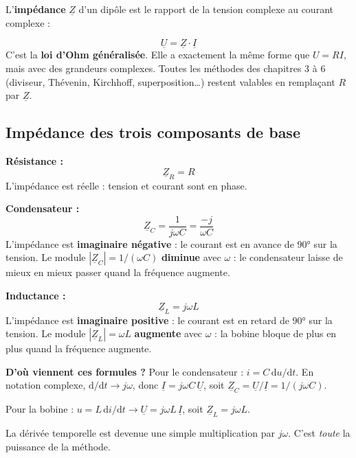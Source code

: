 \documentclass[12pt,a4paper,twoside]{book}
\begin{document}
L'\textbf{impédance} $\underline{Z}$ d'un dipôle est le rapport de la tension complexe au courant complexe :

\begin{formule}
\[
\boxed{\underline{U} = \underline{Z} \cdot \underline{I}}
\]
C'est la \textbf{loi d'Ohm généralisée}. Elle a exactement la même forme que $U = RI$, mais avec des grandeurs complexes. Toutes les méthodes des chapitres 3 à 6 (diviseur, Thévenin, Kirchhoff, superposition\ldots) restent valables en remplaçant $R$ par $\underline{Z}$.
\end{formule}

\subsection{Impédance des trois composants de base}

\begin{formule}
\textbf{Résistance :}
\[
\boxed{\underline{Z}_R = R}
\]
L'impédance est réelle : tension et courant sont en phase.

\vspace{0.3cm}
\textbf{Condensateur :}
\[
\boxed{\underline{Z}_C = \frac{1}{j\omega C} = \frac{-j}{\omega C}}
\]
L'impédance est \textbf{imaginaire négative} : le courant est en avance de $90°$ sur la tension. Le module $|\underline{Z}_C| = 1/(\omega C)$ \textbf{diminue} avec $\omega$ : le condensateur laisse de mieux en mieux passer quand la fréquence augmente.

\vspace{0.3cm}
\textbf{Inductance :}
\[
\boxed{\underline{Z}_L = j\omega L}
\]
L'impédance est \textbf{imaginaire positive} : le courant est en retard de $90°$ sur la tension. Le module $|\underline{Z}_L| = \omega L$ \textbf{augmente} avec $\omega$ : la bobine bloque de plus en plus quand la fréquence augmente.
\end{formule}

\begin{intuition}
\textbf{D'où viennent ces formules ?} Pour le condensateur : $i = C\,\mathrm{d}u/\mathrm{d}t$. En notation complexe, $\mathrm{d}/\mathrm{d}t \to j\omega$, donc $\underline{I} = j\omega C\,\underline{U}$, soit $\underline{Z}_C = \underline{U}/\underline{I} = 1/(j\omega C)$.

Pour la bobine : $u = L\,\mathrm{d}i/\mathrm{d}t \to \underline{U} = j\omega L\,\underline{I}$, soit $\underline{Z}_L = j\omega L$.

La dérivée temporelle est devenue une simple multiplication par $j\omega$. C'est \textit{toute} la puissance de la méthode.
\end{intuition}
\end{document}
